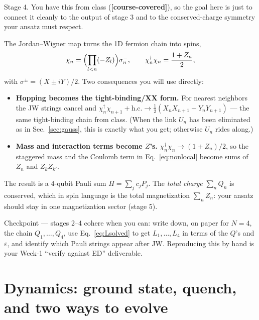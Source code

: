 \documentclass[11pt,a4paper]{article}
\newcommand{\known}{\textcolor{green!55!black}{\textbf{[course-covered]}}}
\begin{document}
\begin{whybox}
Stage 4. You have this from class (\known), so the goal here is just to connect it cleanly to the
output of stage 3 and to the conserved-charge symmetry your ansatz must respect.
\end{whybox}

The Jordan--Wigner map turns the 1D fermion chain into spins,
\begin{equation}
\chi_n = \Bigl(\prod_{l<n}(-Z_l)\Bigr)\sigma^-_n,\qquad
\chi^\dagger_n\chi_n = \frac{1+Z_n}{2},
\label{eq:jw}
\end{equation}
with $\sigma^\pm=(X\pm iY)/2$. Two consequences you will use directly:
\begin{itemize}[leftmargin=1.5em]
\item \textbf{Hopping becomes the tight-binding/XX form.} For nearest neighbors the JW strings
cancel and $\chi^\dagger_n\chi_{n+1}+\text{h.c.}\to \tfrac12(X_nX_{n+1}+Y_nY_{n+1})$ --- the same
tight-binding chain from class. (When the link $U_n$ has been eliminated as in Sec.~\ref{sec:gauss},
this is exactly what you get; otherwise $U_n$ rides along.)
\item \textbf{Mass and interaction terms become $Z$'s.} $\chi^\dagger_n\chi_n\to(1+Z_n)/2$, so the
staggered mass and the Coulomb term in Eq.~\eqref{eq:nonlocal} become sums of $Z_n$ and $Z_kZ_{k'}$.
\end{itemize}
The result is a 4-qubit Pauli sum $H=\sum_j c_j P_j$. The \emph{total charge} $\sum_n Q_n$
is conserved, which in spin language is the total magnetization $\sum_n Z_n$: your ansatz should stay
in one magnetization sector (stage 5).

\begin{checkbox}{Checkpoint --- stages 2--4 cohere when you can:}
write down, on paper for $N=4$, the chain $Q_1,\dots,Q_4$, use Eq.~\eqref{eq:Lsolved} to get
$L_1,\dots,L_4$ in terms of the $Q$'s and $\varepsilon$, and identify which Pauli strings appear
after JW. Reproducing this by hand is your Week-1 ``verify against ED'' deliverable.
\end{checkbox}

\part{Dynamics: ground state, quench, and two ways to evolve}
\end{document}
